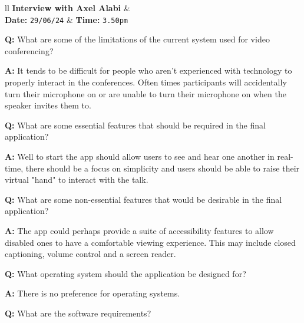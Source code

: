 \begin{tcolorbox}[
  boxrule=0pt, frame empty, colback=lightestgray, arc=0pt,
  breakable, colframe=white
]
  \begin{tblr}{ll}
    \textbf{Interview with Axel Alabi} & {}\\
    \textbf{Date: } \texttt{29/06/24} &
    {\hspace{-1.5cm} \textbf{Time: } \texttt{3.50pm}}
  \end{tblr}

  \vspace{0.2cm}

  \textbf{Q:} What are some of the limitations of the current
  system used for video conferencing? \vspace{0.05cm}

  \textbf{A:} It tends to be difficult for people who aren't 
  experienced with technology to properly interact in the 
  conferences. Often times participants will accidentally turn 
  their microphone on or are unable to turn their microphone
  on when the speaker invites them to. \vspace{0.25cm}

  \textbf{Q:} What are some essential features that should be
  required in the final application? \vspace{0.05cm}

  \textbf{A:} Well to start the app should allow users to see 
  and hear one another in real-time, there should be a focus on
  simplicity and users should be able to raise their virtual 
  "hand" to interact with the talk. \vspace{0.25cm}

  \textbf{Q:} What are some non-essential features that would
  be desirable in the final application? \vspace{0.05cm}

  \textbf{A:} The app could perhaps provide a suite of 
  accessibility features to allow disabled ones to have a 
  comfortable viewing experience. This may include closed
  captioning, volume control and a screen reader.
  \vspace{0.25cm}

  \textbf{Q:} What operating system should the application be 
  designed for? \vspace{0.05cm}

  \textbf{A:} There is no preference for operating systems.
  \vspace{0.25cm}

  \textbf{Q:} What are the software requirements? 
  \vspace{0.05cm}


\end{tcolorbox}
